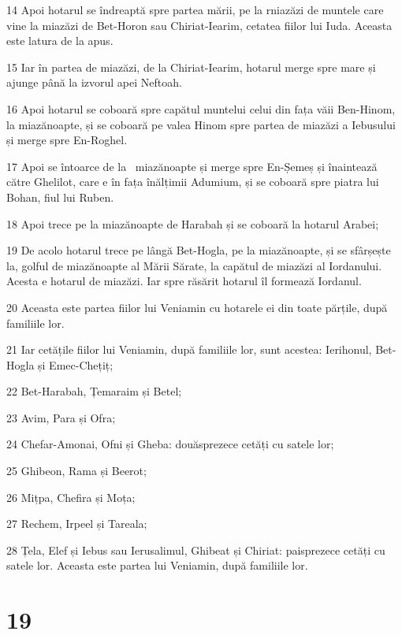 \par 14 Apoi hotarul se îndreaptă spre partea mării, pe la rniazăzi de muntele care vine la miazăzi de Bet-Horon sau Chiriat-Iearim, cetatea fiilor lui Iuda. Aceasta este latura de la apus.
\par 15 Iar în partea de miazăzi, de la Chiriat-Iearim, hotarul merge spre mare și ajunge până la izvorul apei Neftoah.
\par 16 Apoi hotarul se coboară spre capătul muntelui celui din fața văii Ben-Hinom, la miazănoapte, și se coboară pe valea Hinom spre partea de miazăzi a Iebusului și merge spre En-Roghel.
\par 17 Apoi se întoarce de la  miazănoapte și merge spre En-Șemeș și înaintează către Ghelilot, care e în fața înălțimii Adumium, și se coboară spre piatra lui Bohan, fiul lui Ruben.
\par 18 Apoi trece pe la miazănoapte de Harabah și se coboară la hotarul Arabei;
\par 19 De acolo hotarul trece pe lângă Bet-Hogla, pe la miazănoapte, și se sfârșește la, golful de miazănoapte al Mării Sărate, la capătul de miazăzi al Iordanului. Acesta e hotarul de miazăzi. Iar spre răsărit hotarul îl formează Iordanul.
\par 20 Aceasta este partea fiilor lui Veniamin cu hotarele ei din toate părțile, după familiile lor.
\par 21 Iar cetățile fiilor lui Veniamin, după familiile lor, sunt acestea: Ierihonul, Bet-Hogla și Emec-Chețiț;
\par 22 Bet-Harabah, Țemaraim și Betel;
\par 23 Avim, Para și Ofra;
\par 24 Chefar-Amonai, Ofni și Gheba: douăsprezece cetăți cu satele lor;
\par 25 Ghibeon, Rama și Beerot;
\par 26 Mițpa, Chefira și Moța;
\par 27 Rechem, Irpeel și Tareala;
\par 28 Țela, Elef și Iebus sau Ierusalimul, Ghibeat și Chiriat: paisprezece cetăți cu satele lor. Aceasta este partea lui Veniamin, după familiile lor.

\chapter{19}

